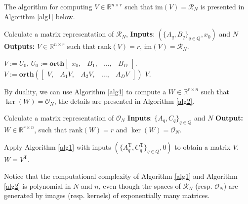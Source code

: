 \documentclass[journal]{IEEEtran}
\newcommand{\IM}{\mathrm{im}}
\newcommand{\QNUM}{D}
\newcommand{\Rank}{\mathrm{rank}}
\begin{document}
The algorithm for computing $V  \in \mathbb{R}^{n \times r}$ such that $\IM(V)=\mathscr{R}_N$ is presented in Algorithm \ref{alg1} below.

\begin{algorithm}[h]
	\caption{
		Calculate  a matrix representation of $\mathscr{R}_N$,
		\newline
		\textbf{Inputs}: $(\{A_q,B_q\}_{q \in Q},x_0)$ and $N$
		\newline
		\textbf{Outputs:} $V  \in \mathbb{R}^{n \times r}$ such that $\Rank (V)=r$,
		$\IM (V) = \mathscr{R}_N$.
	}
	\label{alg1}
	\begin{algorithmic}
		\STATE $V:=U_0$, $U_0:=\mathbf{orth}\begin{bmatrix} x_0,& B_1, & \ldots, & B_{\QNUM} \end{bmatrix}$.
		\STATE
		$V:=\mathbf{orth}(\begin{bmatrix} V, & A_1V, & A_2V, & \ldots, & A_{\QNUM}V \end{bmatrix})$
		\ENDFOR
		\RETURN $V$.
	\end{algorithmic}
\end{algorithm}

By duality, we can use Algorithm \ref{alg1} to compute a $W \in \mathbb{R}^{r \times n}$ such that $\ker(W)=\mathscr{O}_N$, the details are presented in Algorithm \ref{alg2}.

\begin{algorithm}
	\caption{
		Calculate a matrix representation of $\mathscr{O}_N$
		\newline
		\textbf{Inputs}: $\{A_q,C_q\}_{q \in Q}$ and $N$
		\newline
		\textbf{Output:} $W \in \mathbb{R}^{r \times n}$, such that
		$\Rank (W) = r$ and $\ker (W)=\mathscr{O}_N$.
	}
	\label{alg2}
	\begin{algorithmic}
		\STATE Apply Algorithm \ref{alg1} with inputs $(\{A_q^{\mathrm{T}},C_q^{\mathrm{T}}\}_{q \in Q},0)$ to obtain
		a matrix $V$.
		\RETURN $W=V^{\mathrm{T}}$.
	\end{algorithmic}
\end{algorithm} 

Notice that the computational complexity of Algorithm \ref{alg1} and Algorithm \ref{alg2} is polynomial in $N$ and $n$, even though the spaces of $\mathscr{R}_N$ (resp. $ \mathscr{O}_N$) are generated by images (resp. kernels) of exponentially many matrices.
\end{document}
